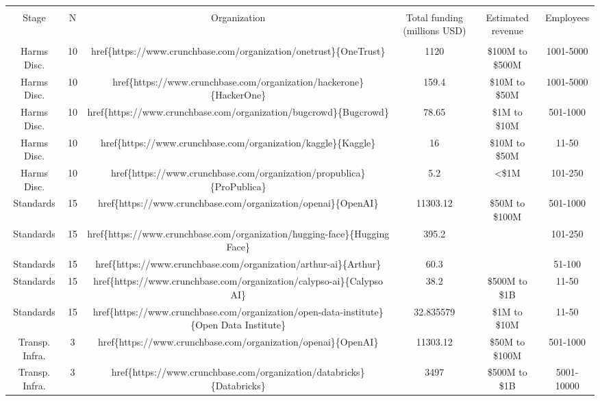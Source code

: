 
\begin{table}[!htbp] \centering 
  \caption{} 
  \label{tab:top-funding} 
\begin{tabular}{@{\extracolsep{5pt}} cccccc} 
\\[-1.8ex]\hline 
\hline \\[-1.8ex] 
Stage & N & Organization & Total funding (millions USD) & Estimated revenue & Employees \\ 
\hline \\[-1.8ex] 
Harms Disc. & 10 & href\{https://www.crunchbase.com/organization/onetrust\}\{OneTrust\} & 1120 & \$100M to \$500M & 1001-5000 \\ 
Harms Disc. & 10 & href\{https://www.crunchbase.com/organization/hackerone\}\{HackerOne\} & 159.4 & \$10M to \$50M & 1001-5000 \\ 
Harms Disc. & 10 & href\{https://www.crunchbase.com/organization/bugcrowd\}\{Bugcrowd\} & 78.65 & \$1M to \$10M & 501-1000 \\ 
Harms Disc. & 10 & href\{https://www.crunchbase.com/organization/kaggle\}\{Kaggle\} & 16 & \$10M to \$50M & 11-50 \\ 
Harms Disc. & 10 & href\{https://www.crunchbase.com/organization/propublica\}\{ProPublica\} & 5.2 & \textless \$1M & 101-250 \\ 
Standards & 15 & href\{https://www.crunchbase.com/organization/openai\}\{OpenAI\} & 11303.12 & \$50M to \$100M & 501-1000 \\ 
Standards & 15 & href\{https://www.crunchbase.com/organization/hugging-face\}\{Hugging Face\} & 395.2 &  & 101-250 \\ 
Standards & 15 & href\{https://www.crunchbase.com/organization/arthur-ai\}\{Arthur\} & 60.3 &  & 51-100 \\ 
Standards & 15 & href\{https://www.crunchbase.com/organization/calypso-ai\}\{Calypso AI\} & 38.2 & \$500M to \$1B & 11-50 \\ 
Standards & 15 & href\{https://www.crunchbase.com/organization/open-data-institute\}\{Open Data Institute\} & 32.835579 & \$1M to \$10M & 11-50 \\ 
Transp. Infra. & 3 & href\{https://www.crunchbase.com/organization/openai\}\{OpenAI\} & 11303.12 & \$50M to \$100M & 501-1000 \\ 
Transp. Infra. & 3 & href\{https://www.crunchbase.com/organization/databricks\}\{Databricks\} & 3497 & \$500M to \$1B & 5001-10000 \\ 

\end{tabular}
\end{table}
